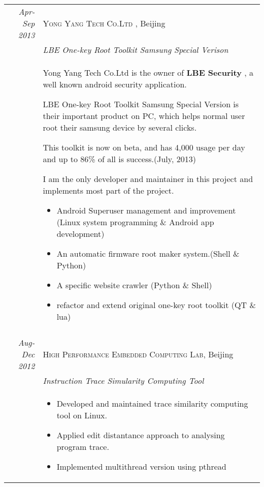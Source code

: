 \documentclass[a4paper,10pt]{article} %
\begin{document}
\begin{tabular}{r|p{11cm}}


\emph{Apr-Sep 2013} &  \textsc{ Yong Yang Tech Co.Ltd }, Beijing \smallskip\\
& \emph{LBE One-key Root Toolkit Samsung Special Verison}\\ 
& \footnotesize{
Yong Yang Tech Co.Ltd is the owner of \textbf{LBE Security} , a well known android security application.

LBE One-key Root Toolkit Samsung Special Version is their important product on PC, which helps normal user root their samsung device by several clicks.

This toolkit is now on beta, and has 4,000 usage per day and up to 86\% of all is success.(July, 2013)

I am the only developer and maintainer in this project and implements most part of the project.

\begin{itemize}
\item Android Superuser management and improvement (Linux system programming \& Android app development)
\item An automatic firmware root maker system.(Shell \& Python)
\item A specific website crawler (Python \& Shell)
\item refactor and extend original one-key root toolkit (QT \& lua)
\end{itemize}

}\smallskip\\
\multicolumn{2}{c}{} \\
\emph{Aug-Dec 2012} &  \textsc{High Performance Embedded Computing Lab}, Beijing \smallskip\\
& \emph{Instruction Trace Simularity Computing Tool}\\  
& \footnotesize{
\begin{itemize}
\item Developed and maintained trace similarity computing tool on Linux.
\item Applied edit distantance approach to analysing program trace.
\item Implemented multithread version using pthread
\end{itemize}
} \smallskip\\
\end{tabular}
\pagebreak
\end{document}
